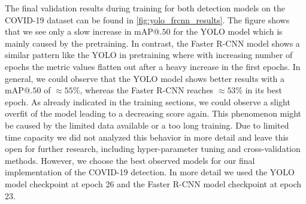 The final validation results during training for both detection models on the COVID-19 dataset can be found in \ref{fig:yolo_frcnn_results}. The figure shows that we see only a slow increase in \ac{mAP}@$.50$ for the \ac{YOLO} model which is mainly caused by the pretraining. In contrast, the Faster \ac{R-CNN} model shows a similar pattern like the \ac{YOLO} in pretraining where with increasing number of epochs the metric values flatten out after a heavy increase in the first epochs. In general, we could observe that the \ac{YOLO} model shows better results with a \ac{mAP}@$.50$ of $\approx 55\%$, whereas the Faster \ac{R-CNN} reaches $\approx 53\%$ in its best epoch. As already indicated in the training sections, we could observe a slight overfit of the model leading to a decreasing score again. This phenomenon might be caused by the limited data available or a too long training. Due to limited time capacity we did not analyzed this behavior in more detail and leave this open for further research, including hyper-parameter tuning and cross-validation methods.
However, we choose the best observed models for our final implementation of the COVID-19 detection. In more detail we used the \ac{YOLO} model checkpoint at epoch 26 and the Faster \ac{R-CNN} model checkpoint at epoch 23.

